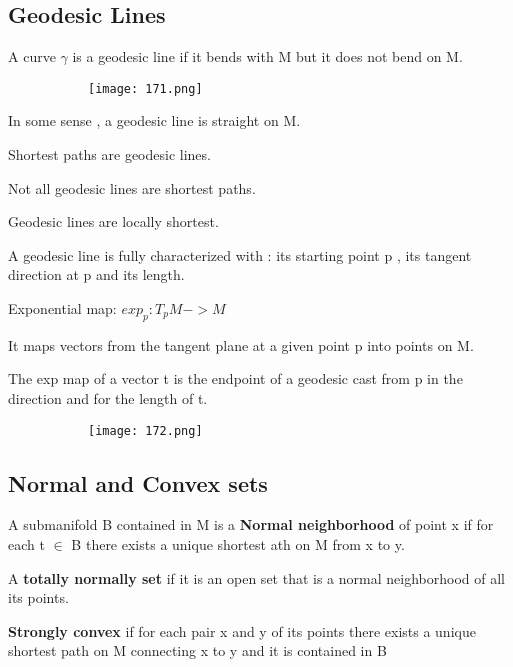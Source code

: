 \documentclass{article}
\begin{document}
\subsection{Geodesic Lines}

A curve $\gamma$ is a geodesic line if it bends with M but it does not bend on M.

    \begin{figure}[ht!]
  \centering
  \begin{subfigure}[b]{0.9\linewidth}
    \texttt{[image: 171.png]}
  \end{subfigure}
\end{figure}

In some sense , a geodesic line is straight on M.

Shortest paths are geodesic lines.

Not all geodesic lines are shortest paths.

Geodesic lines are locally shortest.


A geodesic line is fully characterized with : its starting point p , its tangent direction at p and its length.

Exponential map: $exp_p : T_p M -> M$

It maps vectors from the tangent plane at a given point p into points on M.

The exp map of a vector t is the endpoint of a geodesic cast from p in the direction and for the length of t.

    \begin{figure}[ht!]
  \centering
  \begin{subfigure}[b]{0.5\linewidth}
    \texttt{[image: 172.png]}
  \end{subfigure}
\end{figure}

\subsection{Normal and Convex sets}

A submanifold B contained in M is a \textbf{Normal neighborhood} of point x if for each t $\in$ B there exists a unique shortest ath on M from x to y.

A \textbf{totally normally set} if it is an open set that is a normal neighborhood of all its points.

\textbf{Strongly convex} if for each pair x and y of its points there exists a unique shortest path on M connecting x to y and it is contained in B
\end{document}
